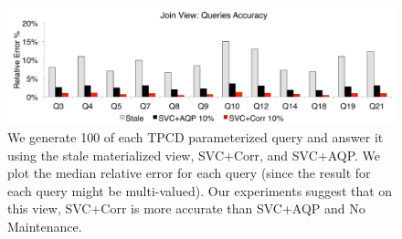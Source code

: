 \begin{figure}[t]
\centering
\includegraphics[scale=0.14]{exp/msj_3.pdf}
 \caption{We generate 100 of each TPCD parameterized query and answer it using the stale materialized view, SVC+Corr, and SVC+AQP. We plot the median relative error for each query (since the result for each query might be multi-valued). Our experiments suggest that on this view, SVC+Corr is more accurate than SVC+AQP and No Maintenance.\label{exp-1-acc}}
\end{figure}

